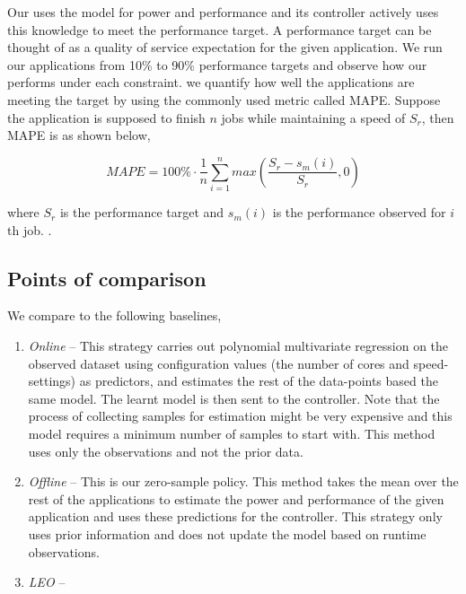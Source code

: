 Our \SYSTEM{} uses the model for power and performance and its controller actively uses this knowledge to meet the performance target. A performance target can be thought of as a quality of service expectation for the given application. We run our applications from 10\% to 90\% performance targets and observe how our \SYSTEM{} performs under each constraint. we quantify how well the applications are meeting the target by using the commonly used metric called MAPE. Suppose the application is supposed to finish $n$ jobs while maintaining a speed of $S_r$, then MAPE is as shown below,

\begin{equation}
MAPE = 100\% \cdot \frac{1}{n} \sum\limits_{i=1}^{n} max \left( \frac{S_{r} - s_m(i)}{S_r},0 \right)
\end{equation}

where $S_{r}$ is the performance target and $s_m(i)$ is the performance observed for $i$th job.
.

\subsection{Points of comparison}

We compare \SYSTEM{} to the following baselines,

\begin{enumerate}
\item \textit{Online} -- This strategy carries out polynomial
  multivariate regression on the observed dataset using configuration
  values (the number of cores and speed-settings) as
  predictors, and estimates the rest of the data-points based the same
  model. The learnt model is then sent to the controller. Note that the process of collecting samples for estimation might be very expensive and this model requires a minimum number of samples to start with. This method uses only the observations and
  not the prior data.
\item \textit{Offline} -- This is our zero-sample policy. This method takes the mean over the rest of the applications to estimate the power and performance of the given application and uses these predictions for the controller.
  This strategy only uses prior information and does not update the model
  based on runtime observations.

\item \textit{LEO} -- 
\end{enumerate}


